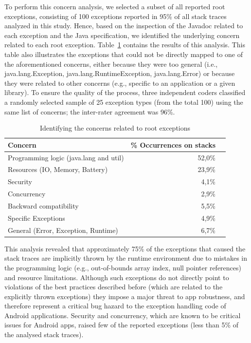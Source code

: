 To perform this concern analysis, we selected a subset of all reported
root exceptions, consisting of 100 exceptions
reported in 95\% of all stack traces analyzed in this study. Hence, based on the inspection of the 
Javadoc related to each exception and the Java specification, we
identified the underlying concern related to each root exception. 
Table~\ref{tab:tophundrend} contains the results of this analysis. This table also illustrates the exceptions 
that could not be directly mapped to one of the aforementioned concerns, either because they were too general (i.e., java.lang.Exception,
java.lang.RuntimeException, java.lang.Error) or because they were
related to other concerns (e.g., specific to an application or a given library). 
To ensure the quality of the process, three independent coders classified a randomly selected
sample of 25 exception types (from the total 100) using the same list of concerns;
the inter-rater agreement was 96\%.

\begin{table}
\scriptsize
\centering
\begin{tabular}{lrr}
\hline
\bfseries{Concern} & \bfseries{\% Occurrences on stacks} \\
\hline
Programming logic (java.lang and util) & 52,0\%\\
Resources (IO, Memory, Battery) & 23,9\% \\
Security & 4,1\%\\
Concurrency & 2,9\% \\
Backward compatibility & 5,5\% \\
Specific Exceptions & 4,9\%\\
General (Error, Exception, Runtime) & 6,7\%\\
\hline
\end{tabular}
\caption{Identifying the concerns related to root exceptions}
\label{tab:tophundrend}
\end{table}

This analysis revealed that approximately 75\% of the exceptions
 that caused the stack traces are implicitly thrown by the runtime 
environment  due to mistakes in the programming logic (e.g., out-of-bounds array index, null pointer 
references) and resource limitations. Although such exceptions do not directly point to violations of
the best practices described before (which are related to the 
explicitly thrown exceptions) they impose a major threat to app robustness,
and therefore represent a critical bug hazard to the exception 
handling code of Android applications. 
Security and concurrency, which are known to be critical issues for Android apps, 
raised few of the reported exceptions (less than 5\% of the analysed stack traces).

